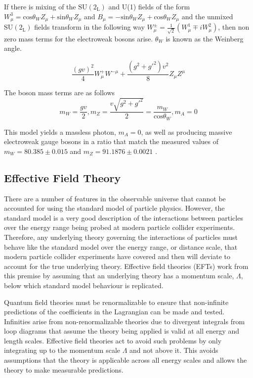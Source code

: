 If there is mixing of the $\text{SU}(2_{\text{L}})$ and U(1) fields of the form $W^{3}_{\mu} = \text{cos}{\theta_{W}}Z_{\mu} + \text{sin}{\theta_{W}}Z_{\mu}$ and $B_{\mu} = -\text{sin}{\theta_{W}}Z_{\mu} + \text{cos}{\theta_{W}}Z_{\mu}$ and the unmixed $\text{SU}(2_{\text{L}})$ fields transform in the following way $W^{\pm}_{\mu} = \frac{1}{\sqrt{2}}(W^{1}_{\mu} \mp i W^{2}_{\mu})$, then non zero mass terms for the electroweak bosons arise.  $\theta_{W}$ is known as the Weinberg angle.

\begin{equation}
\frac{(gv)^{2}}{4} W^{+}_{\mu} W^{-\mu} + \frac{(g^{2} + g'^{2})v^{2}}{8} Z_{\mu} Z^{\mu}
\end{equation}

The boson mass terms are as follows
\begin{equation}
m_{W} = \frac{gv}{2}, m_{Z} = \frac{v\sqrt{g^{2} + g'^{2}}}{2} = \frac{m_{W}}{\text{cos}{\theta_{W}}}, m_{A} = 0
\end{equation}

This model yields a massless photon, $m_{A} = 0$, as well as producing massive electroweak gauge bosons in a ratio that match the measured values of $m_{W} = 80.385 \pm 0.015$ and $m_{Z} = 91.1876 \pm 0.0021$ \cite{Beringer:1900zz}.

\subsection{Effective Field Theory}
There are a number of features in the observable universe that cannot be accounted for using the standard model of particle physics.  However, the standard model is a very good description of the interactions between particles over the energy range being probed at modern particle collider experiments.  Therefore, any underlying theory governing the interactions of particles must behave like the standard model over the energy range, or distance scale, that modern particle collider experiments have covered and then will deviate to account for the true underlying theory.  Effective field theories (EFTs) work from this premise by assuming that an underlying theory has a momentum scale, $\Lambda$, below which standard model behaviour is replicated.  

Quantum field theories must be renormalizable to ensure that non-infinite predictions of the coefficients in the Lagrangian can be made and tested.  Infinities arise from non-renormalizable theories due to divergent integrals from loop diagrams that assume the theory being applied is valid at all energy and length scales.  Effective field theories act to avoid such problems by only integrating up to the momentum scale $\Lambda$ and not above it.  This avoids assumptions that the theory is applicable across all energy scales and allows the theory to make measurable predictions.  

